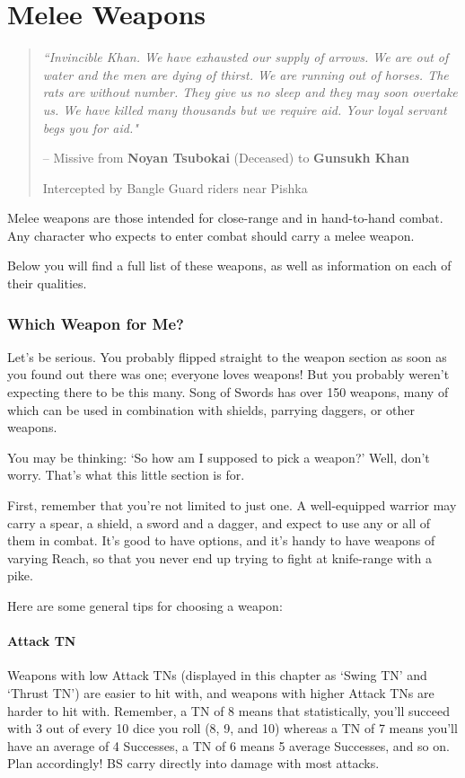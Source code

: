 \documentclass[oneside,11pt,english]{book}
\begin{document}
\chapter{Melee Weapons}\label{ch:Melee Weapons}
\startcontents[chapters]
\clearpage
\begin{quote}
	\emph{“Invincible Khan. We have exhausted our supply of arrows. We are out of water and the men are dying of thirst. We are running out of horses. The rats are without number. They give us no sleep and they may soon overtake us. We have killed many thousands but we require aid. Your loyal servant begs you for aid."}
	
	\hfill -- Missive from \textbf{Noyan Tsubokai} (Deceased) to \textbf{Gunsukh Khan}\par
	\hfill Intercepted by Bangle Guard riders near Pishka 
\end{quote}
Melee weapons are those intended for close-range and in hand-to-hand combat. Any character who expects to enter 
combat should carry a melee weapon. 

Below you will find a full list of these weapons, as well as information on each of their qualities.

\subsection{Which Weapon for Me?}
Let’s be serious. You probably flipped straight to the weapon section as soon as you found out there was one; 
everyone loves weapons! But you probably weren’t expecting there to be this many. Song of Swords has over 150 
weapons, many of which can be used in combination with shields, parrying daggers, or other weapons. 

You may be thinking: ‘So how am I supposed to pick a weapon?’ Well, don’t worry. That’s what this little section is 
for.

First, remember that you’re not limited to just one. A well-equipped warrior may carry a spear, a shield, a sword and a dagger, and expect to use any or all of them in combat. It’s good to have options, and it’s handy to have weapons of varying Reach, so that you never end up trying to fight at knife-range with a pike.

Here are some general tips for choosing a weapon:
\subsubsection{Attack TN}
Weapons with low Attack TNs (displayed in this chapter as ‘Swing TN’ and ‘Thrust TN’) are easier to hit with, and 
weapons with higher Attack TNs are harder to hit with. Remember, a TN of 8 means that statistically, you’ll succeed 
with 3 out of every 10 dice you roll (8, 9, and 10) whereas a TN of 7 means you’ll have an average of 4 Successes, a 
TN of 6 means 5 average Successes, and so on. Plan accordingly! BS carry directly into damage with most attacks.
\end{document}
